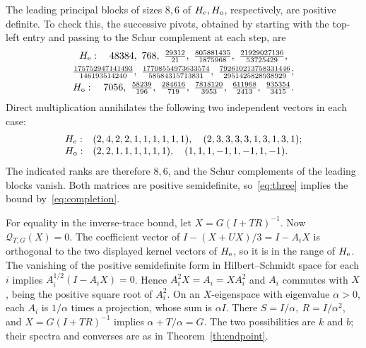 \documentclass[11pt]{article}
\begin{document}
The leading principal blocks of sizes \(8,6\) of \(H_{\rm e},H_{\rm o}\),
respectively, are positive definite. To check this, the successive
pivots, obtained by starting with the top-left entry and passing to
the Schur complement at each step, are
\[
\begin{gathered}
H_{\rm e}:\quad 48384,\ 768,\ \tfrac{29312}{21},\
 \tfrac{805881435}{1875968},\ \tfrac{21929027136}{53725429},\\
 \tfrac{175752947141493}{146193514240},\
 \tfrac{17708554973633574}{58584315713831},\
 \tfrac{792610213758331446}{2951425828938929};\\
H_{\rm o}:\quad 7056,\ \tfrac{58239}{196},\
 \tfrac{284616}{719},\ \tfrac{7818120}{3953},\
 \tfrac{611968}{2413},\ \tfrac{935354}{3415}.
\end{gathered}
\]
Direct multiplication annihilates the following two independent
vectors in each case:
\[
\begin{array}{ll}
H_{\rm e}: &(2,4,2,2,1,1,1,1,1,1),\quad
            (2,3,3,3,3,1,3,1,3,1);\\
H_{\rm o}: &(2,2,1,1,1,1,1,1),\quad(1,1,1,-1,1,-1,1,-1).
\end{array}
\]
The indicated ranks are therefore \(8,6\), and the Schur complements
of the leading blocks vanish. Both matrices are positive semidefinite,
so~\eqref{eq:three} implies the bound by~\eqref{eq:completion}.

For equality in the inverse-trace bound, let \(X=G(I+TR)^{-1}\).
Now \(\mathcal Q_{T,G}(X)=0\).
The coefficient vector of \(I-(X+UX)/3=I-A_iX\) is orthogonal
to the two displayed kernel vectors of \(H_{\rm e}\), so it is in
the range of \(H_{\rm e}\).
The vanishing of the positive semidefinite form in Hilbert--Schmidt
space for each \(i\) implies
\(A_i^{1/2}(I-A_iX)=0\). Hence \(A_i^2X=A_i=XA_i^2\) and \(A_i\)
commutes with \(X\), being the positive square root of \(A_i^2\).
On an \(X\)-eigenspace with eigenvalue \(\alpha>0\),
each \(A_i\) is \(1/\alpha\) times a projection, whose sum is
\(\alpha I\). There \(S=I/\alpha,\ R=I/\alpha^2\), and
\(X=G(I+TR)^{-1}\) implies \(\alpha+T/\alpha=G\).
The two possibilities are \(k\) and \(b\); their spectra and
converses are as in Theorem~\ref{th:endpoint}.
\end{document}

